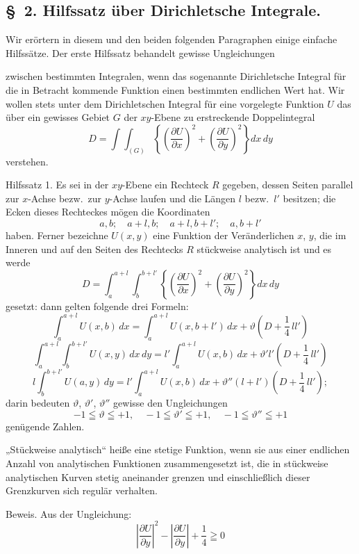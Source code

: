 \documentclass{article}
\begin{document}
\subsection*{§~2. Hilfssatz über Dirichletsche Integrale.}

Wir erörtern in diesem und den beiden folgenden Paragraphen einige einfache Hilfssätze. Der erste Hilfssatz behandelt gewisse Ungleichungen

zwischen bestimmten Integralen, wenn das sogenannte Dirichletsche Integral für die in Betracht kommende Funktion einen bestimmten endlichen Wert hat. Wir wollen stets unter dem Dirichletschen Integral für eine vorgelegte Funktion $U$ das über ein gewisses Gebiet $G$ der $xy$-Ebene zu erstreckende Doppelintegral
\[
D = \int\!\!\int_{(G)} \left\{ \left(\frac{\partial U}{\partial x}\right)^2 + \left(\frac{\partial U}{\partial y}\right)^2 \right\} dx\,dy
\]
verstehen.

Hilfssatz 1. Es sei in der $xy$-Ebene ein Rechteck $R$ gegeben, dessen Seiten parallel zur $x$-Achse bezw.\ zur $y$-Achse laufen und die Längen $l$ bezw.\ $l'$ besitzen; die Ecken dieses Rechteckes mögen die Koordinaten
\[
a, b; \quad a+l, b; \quad a+l, b+l'; \quad a, b+l'
\]
haben. Ferner bezeichne $U(x, y)$ eine Funktion der Veränderlichen $x$, $y$, die im Inneren und auf den Seiten des Rechtecks $R$ stückweise analytisch ist und es werde
\[
D = \int_a^{a+l} \int_b^{b+l'} \left\{ \left(\frac{\partial U}{\partial x}\right)^2 + \left(\frac{\partial U}{\partial y}\right)^2 \right\} dx\,dy
\]
gesetzt: dann gelten folgende drei Formeln:
\[
\int_a^{a+l} U(x, b)\,dx = \int_a^{a+l} U(x, b+l')\,dx + \vartheta \left(D + \frac{1}{4}\,l l'\right) \tag{I}
\]
\[
\int_a^{a+l} \int_b^{b+l'} U(x, y)\,dx\,dy = l' \int_a^{a+l} U(x, b)\,dx + \vartheta' l' \left(D + \frac{1}{4}\,l l'\right) \tag{II}
\]
\[
l \int_b^{b+l'} U(a, y)\,dy = l' \int_a^{a+l} U(x, b)\,dx + \vartheta'' (l + l') \left(D + \frac{1}{4}\,l l'\right); \tag{III}
\]
darin bedeuten $\vartheta$, $\vartheta'$, $\vartheta''$ gewisse den Ungleichungen
\[
-1 \leqq \vartheta \leqq +1, \quad -1 \leqq \vartheta' \leqq +1, \quad -1 \leqq \vartheta'' \leqq +1
\]
genügende Zahlen.

„Stückweise analytisch“ heiße eine stetige Funktion, wenn sie aus einer endlichen Anzahl von analytischen Funktionen zusammengesetzt ist, die in stückweise analytischen Kurven stetig aneinander grenzen und einschließlich dieser Grenzkurven sich regulär verhalten.

Beweis. Aus der Ungleichung:
\[
\left|\frac{\partial U}{\partial y}\right|^2 - \left|\frac{\partial U}{\partial y}\right| + \frac{1}{4} \geqq 0
\]
\end{document}
